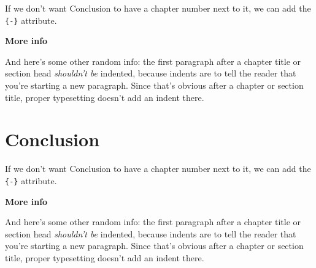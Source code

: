 \documentclass[12pt,twoside]{reedthesis}
\begin{document}
If we don't want Conclusion to have a chapter number next to it, we can add the \texttt{\{-\}} attribute.

\textbf{More info}

And here's some other random info: the first paragraph after a chapter title or section head \emph{shouldn't be} indented, because indents are to tell the reader that you're starting a new paragraph. Since that's obvious after a chapter or section title, proper typesetting doesn't add an indent there.

\hypertarget{conclusion-1}{%
\chapter*{Conclusion}\label{conclusion-1}}

If we don't want Conclusion to have a chapter number next to it, we can add the \texttt{\{-\}} attribute.

\textbf{More info}

And here's some other random info: the first paragraph after a chapter title or section head \emph{shouldn't be} indented, because indents are to tell the reader that you're starting a new paragraph. Since that's obvious after a chapter or section title, proper typesetting doesn't add an indent there.

\appendix
\end{document}
